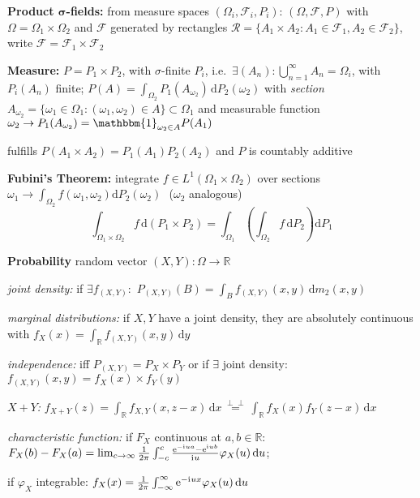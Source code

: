 \documentclass[8pt,twoside]{extarticle}
\newcommand{\indep}{\perp \!\!\! \perp}
\newcommand{\compi}{\mathrm{i}\mkern1mu}
\begin{document}
\begin{multicols}{2}
\textbf{Product $\boldsymbol{\sigma}$-fields:} from measure spaces $(\Omega_i,\mathcal{F}_i,P_i)$: $(\Omega, \mathcal{F}, P)$ with $\Omega=\Omega_1 \times \Omega_2$ and $\mathcal{F}$ generated by rectangles $\mathcal{R}=\{A_1\times A_2:A_1\in\mathcal{F}_1,A_2\in \mathcal{F}_2\}$, write $\mathcal{F}=\mathcal{F}_1\times\mathcal{F}_2$

\textbf{Measure:} $P{=}P_1{\times} P_2$, with $\sigma$-finite $P_i$, i.e.\ $\exists (A_n):\bigcup_{n=1}^\infty\! A_n {=} \Omega_{i}$, with $P_i(A_n)$ finite;
$P(A) = \int_{\Omega_2}P_1(A_{\omega_2})\,\mathrm{d}P_2(\omega_2)$
with \textit{section} $A_{\omega_2}=\{\omega_1 \in\Omega_1:(\omega_1,\omega_2)\in A\} \subset \Omega_1$
and measurable function $\omega_2 \to P_1(A_{\omega_2})=\mathbbm{1}_{\omega_2\in A} P(A_1)$ 


fulfills $P(A_1\times A_2)=P_1(A_1)P_2(A_2)$
and $P$ is countably additive
 
 \textbf{Fubini's Theorem:} integrate $f\in L^1(\Omega_1\times\Omega_2)$ over sections 
 $\omega_1\to\int_{\Omega_2}f(\omega_1,\omega_2)\mathrm{d}P_2(\omega_2)$ \,\,($\omega_2$ analogous)
$$\int_{\Omega_1\times\Omega_2}f\,\mathrm{d}(P_1\times P_2) = \int_{\Omega_1}\left( \int_{\Omega_2}f\,\mathrm{d}P_2\right)\mathrm{d}P_1$$ 
 
 
 
 
 \textbf{Probability} random vector $(X,Y):\Omega\to \mathbb{R}$

\textit{joint density:} if $\exists f_{(X,Y)}:$ $P_{(X,Y)}(B) = \int_B f_{(X,Y)}(x,y)\,\mathrm{d}m_2(x,y)$

\textit{marginal distributions:} if $X,Y$ have a joint density, they are absolutely continuous with $f_X(x) = \int_\mathbb{R}f_{(X,Y)}(x,y)\,\mathrm{d}y$

\textit{independence:} iff $P_{(X,Y)}=P_X\times P_Y$ or if $\exists$ joint density: $f_{(X,Y)}(x,y)=f_X(x)\times f_Y(y)$


\textit{$X {+} Y$:} $f_{X+Y}(z)=\int_{\mathbb{R}}f_{X,Y}(x,z{-}x)\,\mathrm{d}x \overset{\indep}{=} \int_{\mathbb{R}}f_{X}(x) f_Y(z{-}x)\,\mathrm{d}x$

\textit{characteristic function:} if $F_X$ continuous at $a,b\in \mathbb{R}:$ $F_X(b)-F_X(a)=\lim_{c\to \infty} \frac{1}{2\pi}\int_{-c}^c \frac{\mathrm{e}^{-\compi ua}-\mathrm{e}^{\compi ub}}{\compi u}\varphi_X(u)\,\mathrm{d}u$;

if $\varphi_X$ integrable: $f_X(x) = \frac{1}{2\pi}\int_{-\infty}^\infty \mathrm{e}^{-\compi ux}\varphi_X(u)\,\mathrm{d}u$




\end{multicols}
\end{document}
